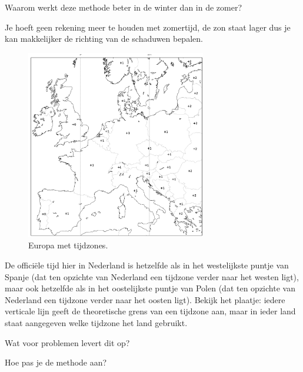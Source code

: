 \begin{opgave}
    Waarom werkt deze methode beter in de winter dan in de zomer? 
    \begin{antwoord}
        Je hoeft geen rekening meer te houden met zomertijd, de zon staat lager dus je kan makkelijker de richting van de schaduwen bepalen.
    \end{antwoord}
\end{opgave}

\begin{figure}[!b]
    \centering
    \includegraphics[width=0.7\textwidth]{europe_timezone_plus.png}
    \caption{Europa met tijdzones.}
\end{figure}

\begin{opgave}
    De offici\"ele tijd hier in Nederland is hetzelfde als in het westelijkste puntje van Spanje (dat ten opzichte van Nederland een tijdzone verder naar het westen ligt), maar ook hetzelfde als in het oostelijkste puntje van Polen (dat ten opzichte van Nederland een tijdzone verder naar het oosten ligt). Bekijk het plaatje: iedere verticale lijn geeft de theoretische grens van een tijdzone aan, maar in ieder land staat aangegeven welke tijdzone het land gebruikt. 
    \begin{subopgave}
        Wat voor problemen levert dit op?
    \end{subopgave}
    \begin{subopgave}[\ster]
        Hoe pas je de methode aan?
    \end{subopgave}
\end{opgave}

